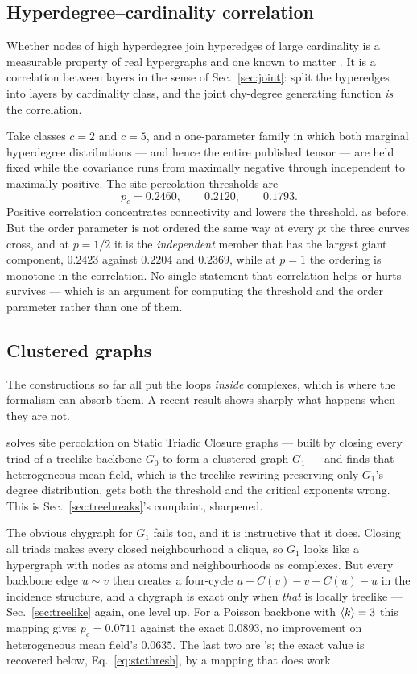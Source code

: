 \subsection{Hyperdegree--cardinality correlation}

Whether nodes of high hyperdegree join hyperedges of large cardinality is a
measurable property of real hypergraphs and one known to matter
\citep{ha2025,fujiki2018}. It is a correlation between layers in the sense of
Sec.~\ref{sec:joint}: split the hyperedges into layers by cardinality class, and
the joint chy-degree generating function \emph{is} the correlation.

Take classes $c=2$ and $c=5$, and a one-parameter family in which both marginal
hyperdegree distributions --- and hence the entire published tensor --- are held
fixed while the covariance runs from maximally negative through independent to
maximally positive. The site percolation thresholds are
\begin{equation}
  p_{c}=0.2460,\qquad 0.2120,\qquad 0.1793.
\end{equation}
Positive correlation concentrates connectivity and lowers the threshold, as
before. But the order parameter is not ordered the same way at every $p$: the
three curves cross, and at $p=1/2$ it is the \emph{independent} member that has
the largest giant component, $0.2423$ against $0.2204$ and $0.2369$, while at
$p=1$ the ordering is monotone in the correlation. No single statement that
correlation helps or hurts survives --- which is an argument for computing the
threshold and the order parameter rather than one of them.

\subsection{Clustered graphs}

The constructions so far all put the loops \emph{inside} complexes, which is
where the formalism can absorb them. A recent result shows sharply what happens
when they are not.

\citet{cirigliano2025} solves site percolation on Static Triadic
Closure graphs --- built by closing every triad of a treelike backbone $G_{0}$
to form a clustered graph $G_{1}$ --- and finds that heterogeneous mean field,
which is the treelike rewiring preserving only $G_{1}$'s degree distribution,
gets both the threshold and the critical exponents wrong. This is
Sec.~\ref{sec:treebreaks}'s complaint, sharpened.

The obvious chygraph for $G_{1}$ fails too, and it is instructive that it does.
Closing all triads makes every closed neighbourhood a clique, so $G_{1}$ looks
like a hypergraph with nodes as atoms and neighbourhoods as complexes. But every
backbone edge $u\sim v$ then creates a four-cycle $u-C(v)-v-C(u)-u$ in the
incidence structure, and a chygraph is exact only when \emph{that} is locally
treelike --- Sec.~\ref{sec:treelike} again, one level up. For a Poisson backbone
with $\langle k \rangle=3$ this mapping gives $p_{c}=0.0711$ against the exact $0.0893$,
no improvement on heterogeneous mean field's $0.0635$. The last two are
\citeauthor{cirigliano2025}'s; the exact value is recovered below,
Eq.~\eqref{eq:stcthresh}, by a mapping that does work.

